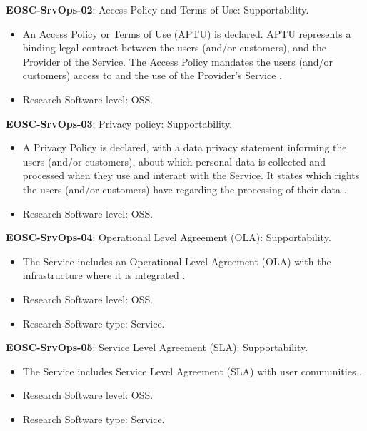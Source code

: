 \textbf{EOSC-SrvOps-02}: Access Policy and Terms of Use: Supportability.

\begin{itemize}
    \item An Access Policy or Terms of Use (APTU) is declared. APTU represents a binding legal contract between the users (and/or customers), and the Provider of the Service. The Access Policy mandates the users (and/or customers) access to and the use of the Provider's Service \cite{orviz_fernandez_eosc-synergy_2020}.
    \item Research Software level: OSS.
\end{itemize}

\textbf{EOSC-SrvOps-03}: Privacy policy: Supportability.

\begin{itemize}
    \item A Privacy Policy is declared, with a data privacy statement informing the users (and/or customers), about which personal data is collected and processed when they use and interact with the Service. It states which rights the users (and/or customers) have regarding the processing of their data \cite{orviz_fernandez_eosc-synergy_2020}.
    \item Research Software level: OSS.
\end{itemize}

\textbf{EOSC-SrvOps-04}: Operational Level Agreement (OLA): Supportability.

\begin{itemize}
    \item The Service includes an Operational Level Agreement (OLA) with the infrastructure where it is integrated \cite{orviz_fernandez_eosc-synergy_2020}.
    \item Research Software level: OSS.
    \item Research Software type: Service.
\end{itemize}

\textbf{EOSC-SrvOps-05}: Service Level Agreement (SLA): Supportability.

\begin{itemize}
    \item The Service includes Service Level Agreement (SLA) with user communities \cite{orviz_fernandez_eosc-synergy_2020}.
    \item Research Software level: OSS.
    \item Research Software type: Service.
\end{itemize}

